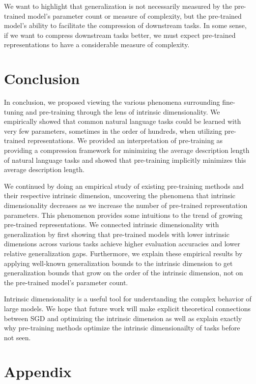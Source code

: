 \documentclass{article} %
\begin{document}
We want to highlight that generalization is not necessarily measured by the pre-trained model's parameter count or measure of complexity, but the pre-trained model's ability to facilitate the compression of downstream tasks. In some sense, if we want to compress downstream tasks better, we must expect pre-trained representations to have a considerable measure of complexity.

\section{Conclusion}
In conclusion, we proposed viewing the various phenomena surrounding fine-tuning and pre-training through the lens of intrinsic dimensionality. We empirically showed that common natural language tasks could be learned with very few parameters, sometimes in the order of hundreds, when utilizing pre-trained representations.  We provided an interpretation of pre-training as providing a compression framework for minimizing the average description length of natural language tasks and showed that pre-training implicitly minimizes this average description length.

We continued by doing an empirical study of existing pre-training methods and their respective intrinsic dimension, uncovering the phenomena that intrinsic dimensionality decreases as we increase the number of pre-trained representation parameters. This phenomenon provides some intuitions to the trend of growing pre-trained representations. We connected intrinsic dimensionality with generalization by first showing that pre-trained models with lower intrinsic dimensions across various tasks achieve higher evaluation accuracies and lower relative generalization gaps. Furthermore, we explain these empirical results by applying well-known generalization bounds to the intrinsic dimension to get generalization bounds that grow on the order of the intrinsic dimension, not on the pre-trained model's parameter count.

Intrinsic dimensionality is a useful tool for understanding the complex behavior of large models. We hope that future work will make explicit theoretical connections between SGD and optimizing the intrinsic dimension as well as explain exactly why pre-training methods optimize the intrinsic dimensionailty of tasks before not seen.





\appendix
\section{Appendix}
\end{document}
